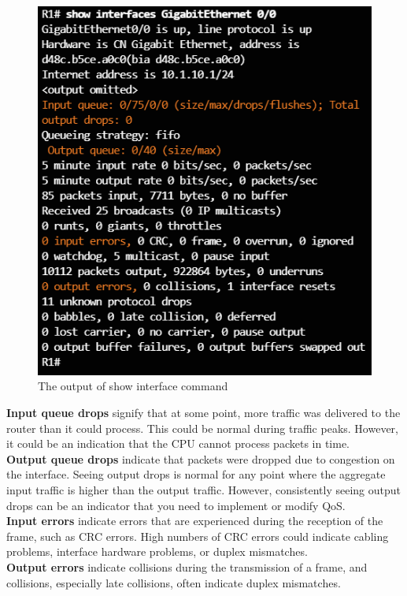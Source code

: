 \begin{figure}[hbtp]
\caption{The output of show interface command}
\centering
\includegraphics[scale=0.8]{pictures/ShowInterface.PNG}
\end{figure}

\textbf{Input queue drops} signify that at some point, more traffic was delivered to the router than it could process. This could be normal during 
traffic peaks. However, it could be an indication that the CPU cannot process packets in time. \\

\textbf{Output queue drops} indicate that packets were dropped due to congestion on the interface. Seeing output drops is normal for any point where the aggregate input traffic is higher than the output traffic. However, consistently seeing output drops can be an indicator that you need to implement or modify QoS.\\

\textbf{Input errors} indicate errors that are experienced during the reception of the frame, such as CRC errors. High numbers of CRC errors could indicate cabling problems, interface hardware problems, or duplex mismatches.\\

\textbf{Output errors} indicate collisions during the transmission of a frame, and collisions, especially late collisions, often indicate duplex mismatches.

